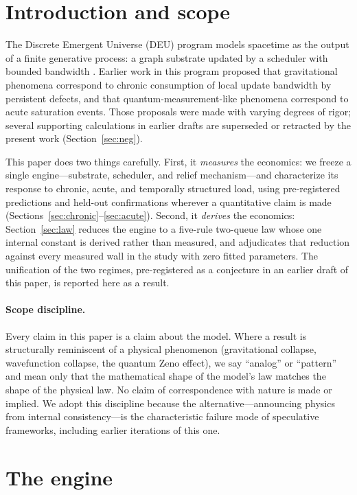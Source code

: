 \documentclass[11pt]{article}
\begin{document}
\section{Introduction and scope}
The Discrete Emergent Universe (DEU) program models spacetime as the output of
a finite generative process: a graph substrate updated by a scheduler with
bounded bandwidth \cite{rmr,foam,gbr,cga,qpc}. Earlier work in this program
proposed that gravitational phenomena correspond to chronic consumption of
local update bandwidth by persistent defects, and that
quantum-measurement-like phenomena correspond to acute saturation events.
Those proposals were made with varying degrees of rigor; several supporting
calculations in earlier drafts are superseded or retracted by the present work
(Section~\ref{sec:neg}).

This paper does two things carefully. First, it \emph{measures} the economics:
we freeze a single engine---substrate, scheduler, and relief mechanism---and
characterize its response to chronic, acute, and temporally structured load,
using pre-registered predictions and held-out confirmations wherever a
quantitative claim is made (Sections~\ref{sec:chronic}--\ref{sec:acute}).
Second, it \emph{derives} the economics: Section~\ref{sec:law} reduces the
engine to a five-rule two-queue law whose one internal constant is derived
rather than measured, and adjudicates that reduction against every measured
wall in the study with zero fitted parameters. The unification of the two
regimes, pre-registered as a conjecture in an earlier draft of this paper, is
reported here as a result.

\paragraph{Scope discipline.} Every claim in this paper is a claim about the
model. Where a result is structurally reminiscent of a physical phenomenon
(gravitational collapse, wavefunction collapse, the quantum Zeno effect), we
say ``analog'' or ``pattern'' and mean only that the mathematical shape of the
model's law matches the shape of the physical law. No claim of correspondence
with nature is made or implied. We adopt this discipline because the
alternative---announcing physics from internal consistency---is the
characteristic failure mode of speculative frameworks, including earlier
iterations of this one.

\section{The engine}
\end{document}
